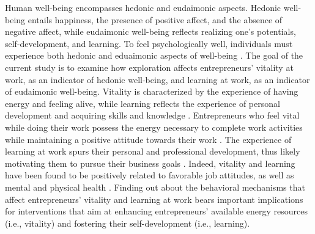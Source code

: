 \documentclass[man, 12pt, a4paper, noextraspace]{apa6}
\begin{document}
Human well-being encompasses hedonic and eudaimonic aspects. 
Hedonic well-being entails happiness, the presence of positive affect, and the absence of negative affect, while eudaimonic well-being reflects realizing one's potentials, self-development, and learning.
To feel psychologically well, individuals must experience both hedonic and eduaimonic aspects of well-being \parencite[e.g.,][]{Ryan.2001}. 
The goal of the current study is to examine how exploration affects entrepreneurs' vitality at work, as an indicator of hedonic well-being, and learning at work, as an indicator of eudaimonic well-being. 
Vitality is characterized by the experience of having energy and feeling alive, while learning reflects the experience of personal development and acquiring skills and knowledge \parencite{Spreitzer.2005b}. 
Entrepreneurs who feel vital while doing their work possess the energy necessary to complete work activities while maintaining a positive attitude towards their work \parencite{Ryan.1997}. 
The experience of learning at work spurs their personal and professional development, thus likely motivating them to pursue their business goals \parencite{Jayawarna2013}. 
Indeed, vitality and learning have been found to be positively related to favorable job attitudes, as well as mental and physical health \parencite{Kleine.2019}.
Finding out about the behavioral mechanisms that affect entrepreneurs' vitality and learning at work bears important implications for interventions that aim at enhancing entrepreneurs' available energy resources (i.e., vitality) and fostering their self-development (i.e., learning). \par 
\end{document}
